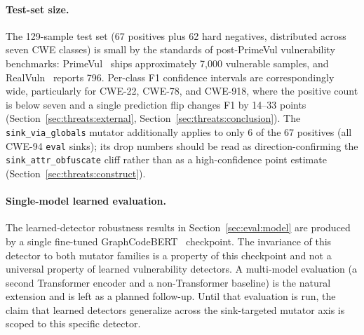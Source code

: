 \paragraph{Test-set size.} The 129-sample test set
(67 positives plus 62 hard negatives, distributed across seven CWE
classes) is small by the standards of post-PrimeVul vulnerability
benchmarks: PrimeVul~\cite{primevul} ships approximately 7{,}000
vulnerable samples, and RealVuln~\cite{realvuln} reports 796.
Per-class F1 confidence intervals are correspondingly wide,
particularly for CWE-22, CWE-78, and CWE-918, where the positive
count is below seven and a single prediction flip changes F1 by
14--33 points (Section~\ref{sec:threats:external},
Section~\ref{sec:threats:conclusion}). The
\texttt{sink\_via\_globals} mutator additionally applies to only 6
of the 67 positives (all CWE-94 \texttt{eval} sinks); its drop
numbers should be read as direction-confirming the
\texttt{sink\_attr\_obfuscate} cliff rather than as a
high-confidence point estimate
(Section~\ref{sec:threats:construct}).

\paragraph{Single-model learned evaluation.} The learned-detector
robustness results in Section~\ref{sec:eval:model} are produced by a
single fine-tuned GraphCodeBERT~\cite{graphcodebert} checkpoint. The
invariance of this detector to both mutator families is a property
of this checkpoint and not a universal property of learned
vulnerability detectors. A multi-model evaluation (a second
Transformer encoder and a non-Transformer baseline) is the natural
extension and is left as a planned follow-up. Until that evaluation
is run, the claim that learned detectors generalize across the
sink-targeted mutator axis is scoped to this specific detector.
